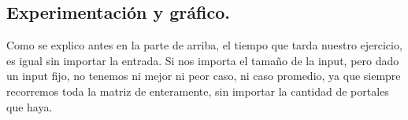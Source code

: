 


\subsection{Experimentación y gráfico.}


\vspace*{0.3cm}
 

Como se explico antes en la parte de arriba,  el tiempo que tarda nuestro ejercicio, es igual sin importar la entrada. Si nos importa el tamaño de la input, pero dado un input fijo, no tenemos ni mejor ni peor caso, ni caso promedio, ya que siempre recorremos toda la matriz de enteramente, sin importar la cantidad de portales que haya. 

